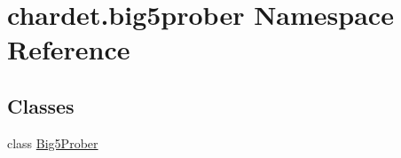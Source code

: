 \hypertarget{namespacechardet_1_1big5prober}{}\section{chardet.\+big5prober Namespace Reference}
\label{namespacechardet_1_1big5prober}
\subsection*{Classes}
\begin{DoxyCompactItemize}
\item 
class \hyperlink{classchardet_1_1big5prober_1_1_big5_prober}{Big5\+Prober}
\end{DoxyCompactItemize}

